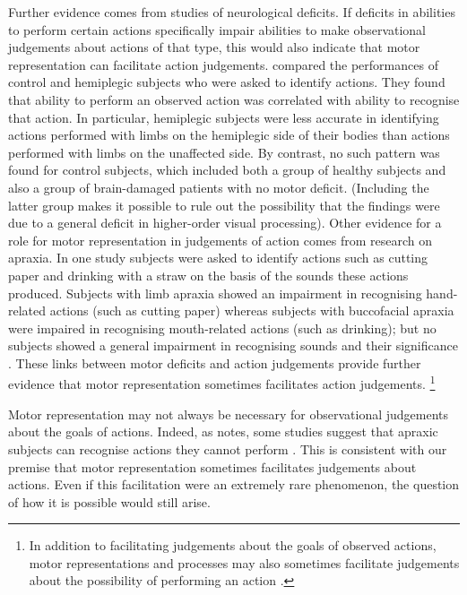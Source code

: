 \documentclass[12pt,\papersize]{extarticle}
\begin{document}
Further evidence comes from  studies of neurological deficits. If deficits in abilities to perform certain actions specifically impair abilities to make observational judgements about actions of that type, this would also indicate that motor representation can facilitate action judgements.  \citet{serino:2009_lesions_} compared the performances of control and hemiplegic subjects who were asked to identify actions. They found that ability to perform an observed action was correlated with ability to recognise that action. In particular, hemiplegic subjects were less accurate in identifying actions performed with limbs on the hemiplegic side of their bodies than actions performed with limbs on the unaffected side. By contrast, no such pattern was found for control subjects, which included both a group of healthy subjects and also a group of brain-damaged patients with no motor deficit.  (Including the latter group makes it possible to rule out the possibility that the findings were due to a general deficit in higher-order visual processing). Other evidence for a role for motor representation in judgements of action comes from research on apraxia. In one study subjects were asked to identify actions such as cutting paper and drinking with a straw on the basis of the sounds these actions produced. Subjects with limb apraxia showed an impairment in recognising hand-related actions (such as cutting paper) whereas subjects with buccofacial apraxia were impaired in recognising mouth-related actions (such as drinking); but no subjects showed a general impairment in recognising sounds and their significance \citep{pazzaglia:2008_sound_}. These links between motor deficits and action judgements provide further evidence that motor representation sometimes facilitates action judgements.%
\footnote{
In addition to facilitating judgements about the goals of observed actions, motor representations and processes may also sometimes facilitate judgements about the possibility of performing an action \citep{grosjean:2007_fitts_law, eskenazi:2009_role}.
}

Motor representation may not always be necessary for observational judgements about the goals of actions. Indeed, as \citet{mahon:2008_action} notes, some studies suggest that apraxic subjects can recognise actions they cannot perform \citep[see also][]{hickok:2009_eight}. This is consistent with our premise that motor representation sometimes facilitates judgements about actions.  Even if this facilitation were an extremely rare phenomenon, the question of how it is possible would still arise.
\end{document}
